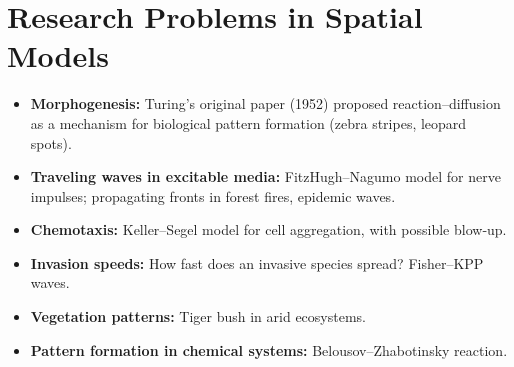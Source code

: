 \documentclass[12pt,a4paper]{book}
\begin{document}
\section{Research Problems in Spatial Models}
\begin{itemize}
    \item \textbf{Morphogenesis:} Turing’s original paper (1952) proposed reaction–diffusion as a mechanism for biological pattern formation (zebra stripes, leopard spots).
    \item \textbf{Traveling waves in excitable media:} FitzHugh–Nagumo model for nerve impulses; propagating fronts in forest fires, epidemic waves.
    \item \textbf{Chemotaxis:} Keller–Segel model for cell aggregation, with possible blow‑up.
    \item \textbf{Invasion speeds:} How fast does an invasive species spread? Fisher–KPP waves.
    \item \textbf{Vegetation patterns:} Tiger bush in arid ecosystems.
    \item \textbf{Pattern formation in chemical systems:} Belousov–Zhabotinsky reaction.
\end{itemize}
\end{document}

